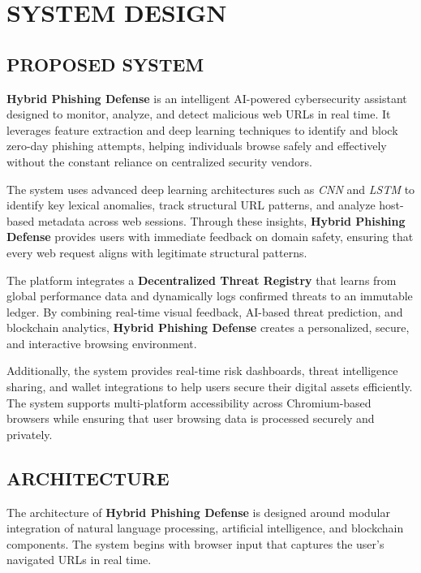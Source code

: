 \newpage
\chapter{SYSTEM DESIGN}

\section{PROPOSED SYSTEM}

\hspace{1cm}\textbf{Hybrid Phishing Defense} is an intelligent AI-powered cybersecurity assistant designed to monitor, analyze, and detect malicious web URLs in real time. It leverages feature extraction and deep learning techniques to identify and block zero-day phishing attempts, helping individuals browse safely and effectively without the constant reliance on centralized security vendors.

The system uses advanced deep learning architectures such as \textit{CNN} and \textit{LSTM} to identify key lexical anomalies, track structural URL patterns, and analyze host-based metadata across web sessions. Through these insights, \textbf{Hybrid Phishing Defense} provides users with immediate feedback on domain safety, ensuring that every web request aligns with legitimate structural patterns.

The platform integrates a \textbf{Decentralized Threat Registry} that learns from global performance data and dynamically logs confirmed threats to an immutable ledger. By combining real-time visual feedback, AI-based threat prediction, and blockchain analytics, \textbf{Hybrid Phishing Defense} creates a personalized, secure, and interactive browsing environment.

Additionally, the system provides real-time risk dashboards, threat intelligence sharing, and wallet integrations to help users secure their digital assets efficiently. The system supports multi-platform accessibility across Chromium-based browsers while ensuring that user browsing data is processed securely and privately.

\section{ARCHITECTURE}

\hspace{1cm}The architecture of \textbf{Hybrid Phishing Defense} is designed around modular integration of natural language processing, artificial intelligence, and blockchain components. The system begins with browser input that captures the user's navigated URLs in real time.

